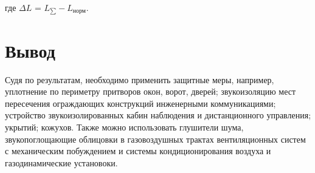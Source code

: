 \begin{table}[H]
	\caption{УЗД для каждого источника в каждой октавной полосе, дБ}
	\label{tab:tab5}
	\raggedleft\tiny
\end{table}

\noindent где $\Delta L$ = $L_{\sum} - L_{\text{норм}}$.


\section*{Вывод}

Судя по результатам, необходимо применить защитные меры, например, уплотнение по периметру притворов окон, ворот, дверей; звукоизоляцию мест пересечения ограждающих конструкций инженерными коммуникациями; устройство звукоизолированных кабин наблюдения и дистанционного управления; укрытий; кожухов. Также можно использовать глушители шума, звукопоглощающие облицовки в газовоздушных трактах вентиляционных систем с механическим побуждением и системы кондиционирования воздуха и газодинамические установоки.



